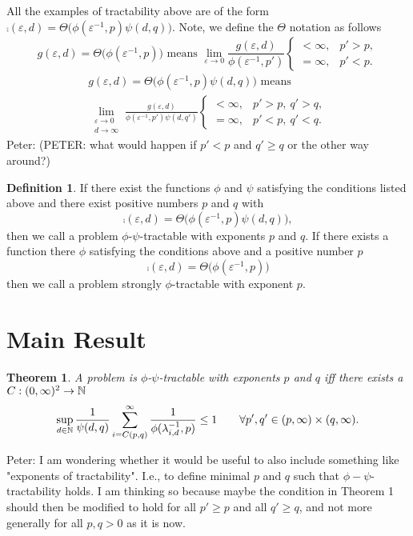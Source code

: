 \documentclass{article}
\newtheorem{theorem}{Theorem}
\theoremstyle{definition}
\newtheorem{definition}{Definition}
\newcommand{\peter}[1]{\begingroup\color{purple}Peter: #1\endgroup}
\begin{document}
All the examples of tractability above are of the form $\comp(\varepsilon, d) = \Theta \bigl( \phi(\varepsilon^{-1},p) \psi(d,q)\bigr)$.  Note, we define the $\Theta$ notation as follows
\begin{equation*}
     g(\varepsilon,d) = \Theta\bigl(\phi(\varepsilon^{-1},p) \bigr) \text{ means } 
    \lim_{\varepsilon \to 0} \frac{g(\varepsilon,d)}{\phi(\varepsilon^{-1},p')}
           \begin{cases} < \infty, & p'> p,  \\ 
          =\infty, & p' < p.\end{cases}
\end{equation*}
\begin{multline*}
     g(\varepsilon,d) = \Theta\bigl(\phi(\varepsilon^{-1},p) \psi(d,q) \bigr) \text{ means } \\
    \lim_{\substack{\varepsilon \to 0 \\ d \to \infty}} \frac{g(\varepsilon,d)}{\phi(\varepsilon^{-1},p') \psi(d,q')}
          \begin{cases} < \infty, & p'> p, \  q' > q,  \\ 
          =\infty, & p' < p, \ q' < q.\end{cases}
\end{multline*}
\peter{(PETER: what would happen if $p'<p$ and $q'\ge q$ or the other way around?)}

\begin{definition}
If there exist the functions $\phi$ and $\psi$ satisfying the conditions listed above and there exist positive numbers $p$ and $q$ with
\[
\comp(\varepsilon, d)  = \Theta\bigl(\phi(\varepsilon^{-1},p) \psi(d,q) \bigr),
\]
then we call a problem $\phi$-$\psi$-tractable with exponents $p$ and $q$.  If there exists a function there $\phi$ satisfying the conditions above and a positive number $p$
\[
\comp(\varepsilon, d)  = \Theta\bigl(\phi(\varepsilon^{-1},p) \bigr)
\]
then we call a problem strongly $\phi$-tractable with exponent $p$.
\end{definition}



\section{Main Result}
\begin{theorem}\label{thm_main} 
A problem is $\phi$-$\psi$-tractable with exponents $p$ and $q$ iff there exists a  $C : (0,\infty)^2 \to \mathbb{N}$
\begin{equation} \label{eq:tractiff}
    \sup_{d \in \mathbb{N}} \frac{1}{\psi(d,q)} \sum_{i = C(p,q)}^\infty \frac{1}{\phi(\lambda_{i, d}^{-1},p)} \le 1 \qquad \forall p',q' \in (p,\infty)\times (q,\infty).
\end{equation}
\end{theorem}
\peter{I am wondering whether it would be useful to also include something like "exponents of tractability". I.e., to define minimal $p$ and $q$ such that $\phi-\psi$-tractability holds. I am thinking so because maybe the condition in Theorem 1 should then be modified to hold for all $p'\ge p$ and all $q'\ge q$, and not more generally for all $p,q>0$ as it is now.}
\end{document}
